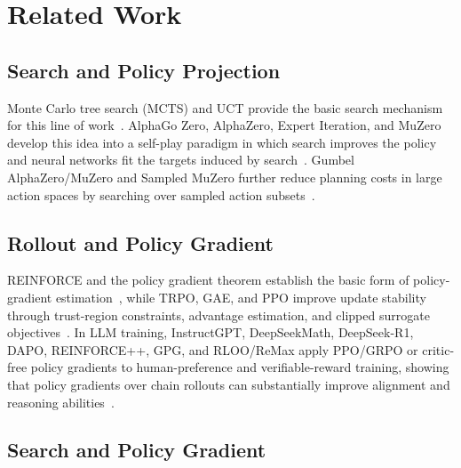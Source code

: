 \section{Related Work}
\label{sec:related-work}

\subsection{Search and Policy Projection}

Monte Carlo tree search (MCTS) and UCT provide the basic search mechanism for this line of work~\citep{kocsis2006bandit,browne2012survey}. AlphaGo Zero, AlphaZero, Expert Iteration, and MuZero develop this idea into a self-play paradigm in which search improves the policy and neural networks fit the targets induced by search~\citep{ref_alphagozero,ref_alphazero,ref_exit,ref_muzero}. Gumbel AlphaZero/MuZero and Sampled MuZero further reduce planning costs in large action spaces by searching over sampled action subsets~\citep{danihelka2022policy,hubert2021learning}.

\subsection{Rollout and Policy Gradient}

REINFORCE and the policy gradient theorem establish the basic form of policy-gradient estimation~\citep{williams1992simple,sutton1999policy}, while TRPO, GAE, and PPO improve update stability through trust-region constraints, advantage estimation, and clipped surrogate objectives~\citep{schulman2015trust,ref_gae,ref_ppo}. In LLM training, InstructGPT, DeepSeekMath, DeepSeek-R1, DAPO, REINFORCE++, GPG, and RLOO/ReMax apply PPO/GRPO or critic-free policy gradients to human-preference and verifiable-reward training, showing that policy gradients over chain rollouts can substantially improve alignment and reasoning abilities~\citep{ouyang2022training,ref_grpo,ref_r1,ref_dapo,ref_reinforcepp,ref_gpg,ahmadian2024back,li2023remax}.

\subsection{Search and Policy Gradient}

